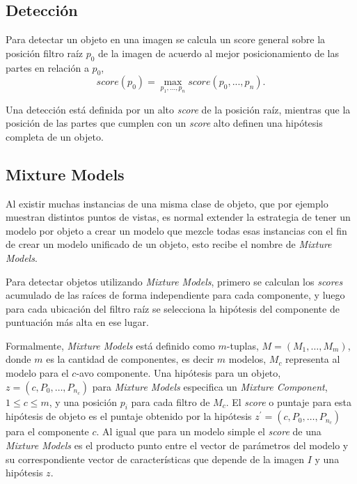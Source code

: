 \subsection{Detección}\label{subsec:detection}
Para detectar un objeto en una imagen se calcula un score general sobre la posición filtro raíz $p_0$ de la imagen de acuerdo al mejor posicionamiento de las partes en relación a $p_0$, 
\begin{equation}	\label{max_score}
	\mathit{score}(p_{0}) = \max_{p_{1}, ..., p_{n}} \mathit{score}(p_{0}, ..., p_{n}).
\end{equation} 

Una detección está definida por un alto \textit{score} de la posición raíz, mientras que  la posición de las partes que cumplen con un \textit{score} alto definen una hipótesis completa de un objeto.

\subsection{Mixture Models}\label{subsec:m_models}
Al existir muchas instancias de una misma clase de objeto, que por ejemplo muestran distintos puntos de vistas, es normal extender la estrategia de tener un modelo por objeto a crear un modelo que mezcle todas esas instancias con el fin de crear un modelo unificado de un objeto, esto recibe el nombre de \textit{Mixture Models}.

Para detectar objetos utilizando \textit{Mixture Models}, primero se calculan los \textit{scores} acumulado de las raíces de forma independiente para cada componente, y luego para cada ubicación del filtro raíz se selecciona la hipótesis del componente de puntuación más alta en ese lugar.

Formalmente, \textit{Mixture Models} está definido como $m$-tuplas, $M = (M_1, \dots, M_m)$, donde $m$ es la cantidad de componentes, es decir $m$ modelos, $M_c$ representa al modelo para el $c$-avo componente. Una hipótesis para un objeto, $z = (c, P_0, \dots, P_{n_c})$ para \textit{Mixture Models} especifica un \textit{Mixture Component}, $1 \leq c \leq m$, y una posición $p_i$ para cada filtro de $M_c$. El \textit{score} o puntaje para esta hipótesis de objeto es el puntaje obtenido por la hipótesis $z^{\prime} = (c, P_0, \dots, P_{n_c})$ para el componente $c$. Al igual que para un modelo simple el \textit{score} de una \textit{Mixture Models} es el producto punto entre el vector de parámetros del modelo y su correspondiente vector de características que depende de la imagen $I$ y una hipótesis $z$.

